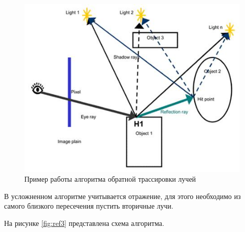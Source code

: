 \begin{figure}[ht!]
	\begin{center}
		\captionsetup{singlelinecheck = false, justification=centerfirst}
		\includegraphics[scale=0.8]{assets/tracric.jpeg}
		\caption{Пример работы алгоритма обратной трассировки лучей}
		\label{img:tracric}
	\end{center}
	
\end{figure}


В усложненном алгоритме учитывается отражение, для этого необходимо из самого близкого пересечения пустить вторичные лучи.

На рисунке \eqref{fig:ref3} представлена схема алгоритма.


